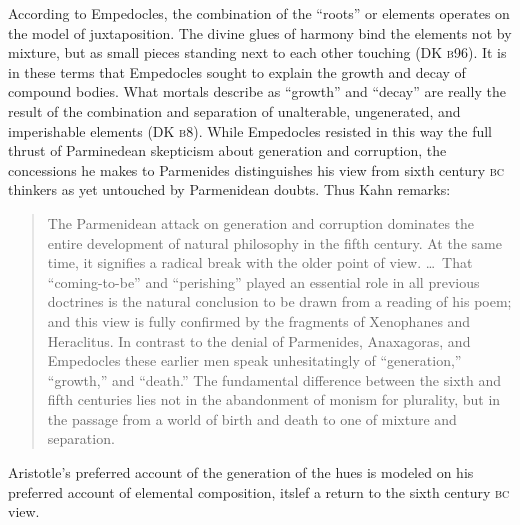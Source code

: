 According to Empedocles, the combination of the ``roots'' or elements operates on the model of juxtaposition. The divine glues of harmony bind the elements not by mixture, but as small pieces standing next to each other touching (DK \textsc{b}96). It is in these terms that Empedocles sought to explain the growth and decay of compound bodies. What mortals describe as ``growth'' and ``decay'' are really the result of the combination and separation of unalterable, ungenerated, and imperishable elements (DK \textsc{b}8). %
While Empedocles resisted in this way the full thrust of Parminedean skepticism about generation and corruption, the concessions he makes to Parmenides distinguishes his view from sixth century \textsc{bc} thinkers as yet untouched by Parmenidean doubts. Thus Kahn remarks:
\begin{quote}
	The Parmenidean attack on generation and corruption dominates the entire development of natural philosophy in the fifth century. At the same time, it signifies a radical break with the older point of view. \ldots\ That ``coming-to-be'' and ``perishing'' played an essential role in all previous doctrines is the natural conclusion to be drawn from a reading of his poem; and this view is fully confirmed by the fragments of Xenophanes and Heraclitus. In contrast to the denial of Parmenides, Anaxagoras, and Empedocles these earlier men speak unhesitatingly of ``generation,'' ``growth,'' and ``death.'' The fundamental difference between the sixth and fifth centuries lies not in the abandonment of monism for plurality, but in the passage from a world of birth and death to one of mixture and separation. \citep[154--155]{Kahn:1994qf}
\end{quote}
Aristotle's preferred account of the generation of the hues is modeled on his preferred account of elemental composition, itslef a return to the sixth century \textsc{bc} view.

